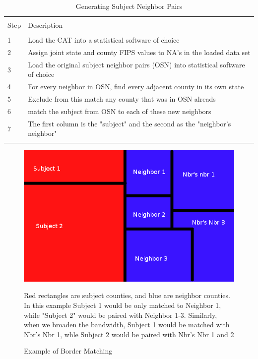 \documentclass[12pt,a4paper]{article}
\begin{document}
\begin{table}[!htbp] \centering 
  \caption{Generating Subject Neighbor Pairs} 
  \label{genextrd} 
\begin{tabular}{@{\extracolsep{5pt}}ll} 
\\[-1.8ex]\hline 
\hline \\[-1.8ex] 
Step & Description\\ 
\hline \\[-1.8ex] 
1 & Load the CAT into a statistical software of choice \\
2 & Assign joint state and county FIPS values to NA's in the loaded data set \\
3 & Load the original subject neighbor pairs (OSN) into statistical software of choice \\
4 & For every neighbor in OSN, find every adjacent county in its own state \\
5 & Exclude from this match any county that was in OSN alreads \\
6 & match the subject from OSN to each of these new neighbors \\ 
7 & The first column is the "subject" and the second as the "neighbor's neighbor" \\
\hline \\[-1.8ex]
\end{tabular} 
\end{table} 

\begin{figure}[h]\label{rb}
    \centering
    \caption{Example of Border Matching}
    \begin{minipage}{0.70\textwidth}
    \includegraphics[scale = 0.5]{../analysis/output/borders_temp.png}
    {\footnotesize Red rectangles are subject counties, and blue are neighbor counties. In this example Subject 1 would be only matched to Neighbor 1, while "Subject 2" would be paired with Neighbor 1-3. Similarly, when we broaden the bandwidth, Subject 1 would be matched with Nbr's Nbr 1, whle Subject 2 would be paired with Nbr's Nbr 1 and 2 \par}
    \end{minipage}
\end{figure}
\end{document}
